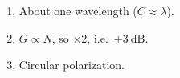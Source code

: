 \begin{enumerate}[leftmargin=1.6em,itemsep=2pt]
\item About one wavelength ($C \approx \lambda$).
\item $G \propto N$, so $\times2$, i.e.\ $+3\ \text{dB}$.
\item Circular polarization.
\end{enumerate}
